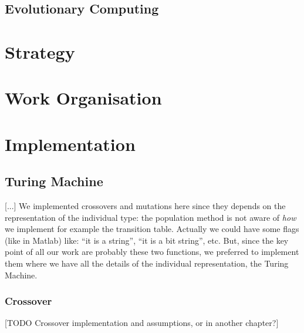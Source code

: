 \documentclass{report}
\begin{document}

\section{Evolutionary Computing}
\label{sec:ec}

\chapter{Strategy}
\label{chap:strategy}

\chapter{Work Organisation}
\label{chap:wo}

\chapter{Implementation}
\label{chap:impl}

\section{Turing Machine}
[...]
We implemented crossovers and mutations here since they depends on the representation of the individual type: the population method is not aware of \textit{how} we implement for example the transition table. Actually we could have some flags (like in Matlab) like: ``it is a string'', ``it is a bit string'', etc. But, since the key point of all our work are probably these two functions, we preferred to implement them where we have all the details of the individual representation, the Turing Machine.

\subsection{Crossover}
\label{sec:crossover}
[TODO Crossover implementation and assumptions, or in another chapter?]
\end{document}
